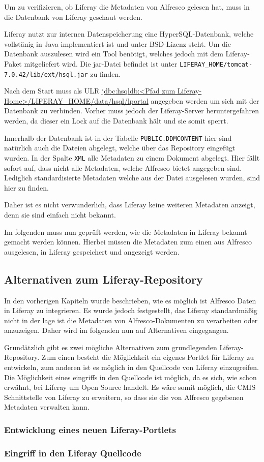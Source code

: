 Um zu verifizieren, ob Liferay die Metadaten von Alfresco gelesen hat, muss in die Datenbank von Liferay geschaut werden.

Liferay nutzt zur internen Datenspeicherung eine HyperSQL-Datenbank, welche vollst\"anig in Java implementiert ist und unter BSD-Lizenz steht. Um die Datenbank auszulesen wird ein Tool ben\"otigt, welches jedoch mit dem Liferay-Paket mitgeliefert wird. Die jar-Datei befindet ist unter \texttt{LIFERAY\_HOME/tomcat-7.0.42/lib/ext/hsql.jar} zu finden.

Nach dem Start muss als ULR \url{jdbc:hsqldb:<Pfad zum Liferay-Home>/LIFERAY\_HOME/data/hsql/lportal} angegeben werden um sich mit der Datenbank zu verbinden. Vorher muss jedoch der Liferay-Server heruntergefahren werden, da dieser ein Lock auf die Datenbank h\"alt und sie somit sperrt.

Innerhalb der Datenbank ist in der Tabelle \texttt{PUBLIC.DDMCONTENT} hier sind nat\"urlich auch die Dateien abgelegt, welche \"uber das Repository eingef\"ugt wurden. In der Spalte \texttt{XML} alle Metadaten zu einem Dokument abgelegt. Hier f\"allt sofort auf, dass nicht alle Metadaten, welche Alfresco bietet angegeben sind. Lediglich standardisierte Metadaten welche aus der Datei ausgelesen wurden, sind hier zu finden. 

Daher ist es nicht verwunderlich, dass Liferay keine weiteren Metadaten anzeigt, denn sie sind einfach nicht bekannt.

Im folgenden muss nun gepr\"uft werden, wie die Metadaten in Liferay bekannt gemacht werden k\"onnen. Hierbei m\"ussen die Metadaten zum einen aus Alfresco ausgelesen, in Liferay gespeichert und angezeigt werden.

\subsection{Alternativen zum Liferay-Repository}
In den vorherigen Kapiteln wurde beschrieben, wie es m\"oglich ist Alfresco Daten in Liferay zu integrieren. Es wurde jedoch festgestellt, das Liferay standardm\"a\ss{}ig nicht in der lage ist die Metadaten von Alfresco-Dokumenten zu verarbeiten oder anzuzeigen. Daher wird im folgenden nun auf Alternativen eingegangen.

Grund\"atzlich gibt es zwei m\"ogliche Alternativen zum grundlegenden Liferay-Repository. Zum einen besteht die M\"oglichkeit ein eigenes Portlet f\"ur Liferay zu entwickeln, zum anderen ist es m\"oglich in den Quellcode von Liferay einzugreifen. Die M\"oglichkeit eines eingriffs in den Quellcode ist m\"oglich, da es sich, wie schon erw\"ahnt, bei Liferay um Open Source handelt. Es w\"are somit m\"oglich, die CMIS Schnittstelle von Liferay zu erweitern, so dass sie die von Alfresco gegebenen Metadaten verwalten kann.

\subsubsection{Entwicklung eines neuen Liferay-Portlets}

\subsubsection{Eingriff in den Liferay Quellcode}